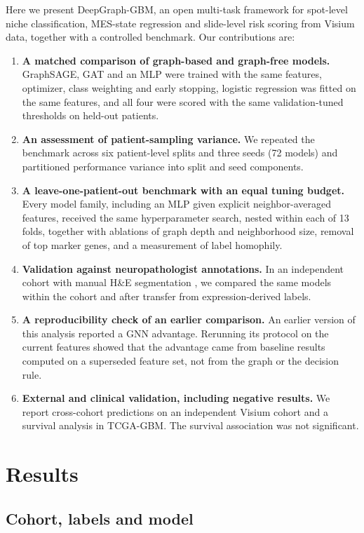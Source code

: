 \documentclass[11pt,letterpaper]{article}
\begin{document}
Here we present DeepGraph-GBM, an open multi-task framework for spot-level niche classification, MES-state regression and slide-level risk scoring from Visium data, together with a controlled benchmark. Our contributions are:
\begin{enumerate}
  \item \textbf{A matched comparison of graph-based and graph-free models.} GraphSAGE, GAT and an MLP were trained with the same features, optimizer, class weighting and early stopping, logistic regression was fitted on the same features, and all four were scored with the same validation-tuned thresholds on held-out patients.
  \item \textbf{An assessment of patient-sampling variance.} We repeated the benchmark across six patient-level splits and three seeds (72 models) and partitioned performance variance into split and seed components.
  \item \textbf{A leave-one-patient-out benchmark with an equal tuning budget.} Every model family, including an MLP given explicit neighbor-averaged features, received the same hyperparameter search, nested within each of 13 folds, together with ablations of graph depth and neighborhood size, removal of top marker genes, and a measurement of label homophily.
  \item \textbf{Validation against neuropathologist annotations.} In an independent cohort with manual H\&E segmentation \cite{ravi2022,ritter2025}, we compared the same models within the cohort and after transfer from expression-derived labels.
  \item \textbf{A reproducibility check of an earlier comparison.} An earlier version of this analysis reported a GNN advantage. Rerunning its protocol on the current features showed that the advantage came from baseline results computed on a superseded feature set, not from the graph or the decision rule.
  \item \textbf{External and clinical validation, including negative results.} We report cross-cohort predictions on an independent Visium cohort and a survival analysis in TCGA-GBM. The survival association was not significant.
\end{enumerate}

\section{Results}

\subsection{Cohort, labels and model}
\end{document}
